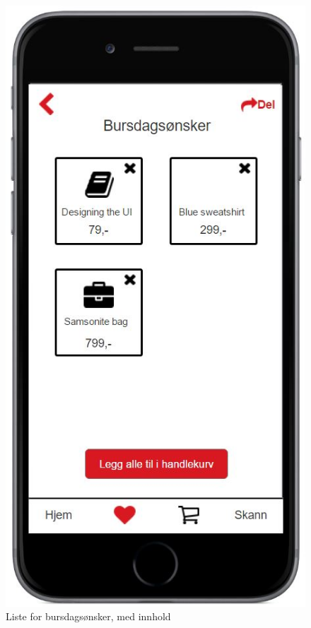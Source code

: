 \begin{figure}[H]
\includegraphics[scale=0.55]{images/axurebilder/bursdagsonsker}
\centering %
\caption{Liste for bursdagsønsker, med innhold}
\label{fig:bursdagsonsker}
\end{figure}

